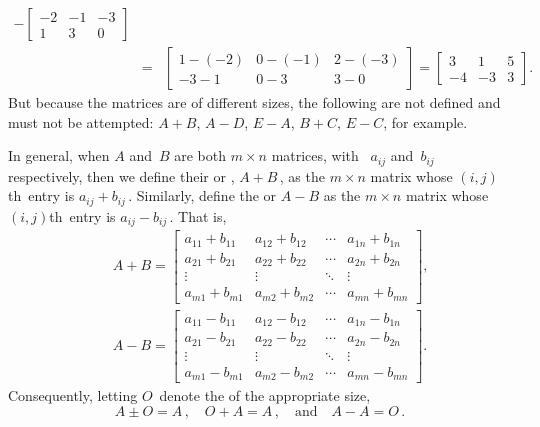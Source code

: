\begin{example}
\begin{eqnarray*}
-\begin{bmatrix} -2 & -1 & -3\\ 1 & 3 & 0 \end{bmatrix}
\\&=&\begin{bmatrix} 1-(-2) & 0-(-1) & 2-(-3)\\ -3-1 & 0-3 & 3-0 \end{bmatrix}
=\begin{bmatrix} 3 &1 & 5\\ -4 & -3 & 3 \end{bmatrix}.
\end{eqnarray*}
But because the matrices are of different sizes, the following are not defined and must not be attempted: \(A+B\), \(A-D\), \(E-A\), \(B+C\), \(E-C\), for example.
\end{example}

In general, when \(A\) and~\(B\) are both \(m\times n\) matrices, with ~\(a_{ij}\) and~\(b_{ij}\) respectively, then we define their  or , \(A+B\)\,, as the \(m\times n\) matrix whose \((i,j)\)th~entry is \(a_{ij}+b_{ij}\)\,.  
Similarly, define the  or  \(A-B\) as the \(m\times n\) matrix whose \((i,j)\)th~entry is \(a_{ij}-b_{ij}\)\,.
That is,
\begin{eqnarray*}&&
A+B=\begin{bmatrix} a_{11}+b_{11}&a_{12}+b_{12}&\cdots&a_{1n}+b_{1n}
\\a_{21}+b_{21}&a_{22}+b_{22}&\cdots&a_{2n}+b_{2n}
\\\vdots&\vdots&\ddots&\vdots
\\a_{m1}+b_{m1}&a_{m2}+b_{m2}&\cdots&a_{mn}+b_{mn} \end{bmatrix},
\\[1ex]&&
A-B=\begin{bmatrix} a_{11}-b_{11}&a_{12}-b_{12}&\cdots&a_{1n}-b_{1n}
\\a_{21}-b_{21}&a_{22}-b_{22}&\cdots&a_{2n}-b_{2n}
\\\vdots&\vdots&\ddots&\vdots
\\a_{m1}-b_{m1}&a_{m2}-b_{m2}&\cdots&a_{mn}-b_{mn} \end{bmatrix}.
\end{eqnarray*}
Consequently, letting \(O\)~denote the  of the appropriate size,  
\begin{equation*}
A\pm O=A\,,\quad
O+A=A\,,\quad\text{and}\quad
A-A=O\,.
\end{equation*}



